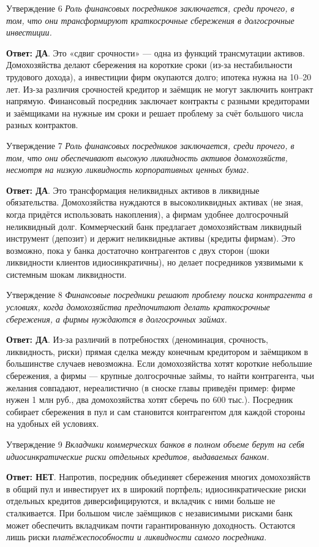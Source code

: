 \documentclass[10pt,a4paper]{article}
\newcommand{\qda}{\textbf{\color{yesgreen}Ответ: ДА}}
\newcommand{\qnet}{\textbf{\color{nored}Ответ: НЕТ}}
\newenvironment{answer}[2]{%
  \begin{qbox}{Утверждение #1}
  \textit{#2}\par\smallskip
}{%
  \end{qbox}\vspace{2pt}
}
\begin{document}
\begin{answer}{6}{Роль финансовых посредников заключается, среди прочего, в том, что они трансформируют краткосрочные сбережения в долгосрочные инвестиции.}
\qda. Это «сдвиг срочности» --- одна из функций трансмутации активов. Домохозяйства делают сбережения на короткие сроки (из-за нестабильности трудового дохода), а инвестиции фирм окупаются долго; ипотека нужна на 10--20 лет. Из-за различия срочностей кредитор и заёмщик не могут заключить контракт напрямую. Финансовый посредник заключает контракты с разными кредиторами и заёмщиками на нужные им сроки и решает проблему за счёт большого числа разных контрактов.
\end{answer}

\begin{answer}{7}{Роль финансовых посредников заключается, среди прочего, в том, что они обеспечивают высокую ликвидность активов домохозяйств, несмотря на низкую ликвидность корпоративных ценных бумаг.}
\qda. Это трансформация неликвидных активов в ликвидные обязательства. Домохозяйства нуждаются в высоколиквидных активах (не зная, когда придётся использовать накопления), а фирмам удобнее долгосрочный неликвидный долг. Коммерческий банк предлагает домохозяйствам ликвидный инструмент (депозит) и держит неликвидные активы (кредиты фирмам). Это возможно, пока у банка достаточно контрагентов с двух сторон (шоки ликвидности клиентов идиосинкратичны), но делает посредников уязвимыми к системным шокам ликвидности.
\end{answer}

\begin{answer}{8}{Финансовые посредники решают проблему поиска контрагента в условиях, когда домохозяйства предпочитают делать краткосрочные сбережения, а фирмы нуждаются в долгосрочных займах.}
\qda. Из-за различий в потребностях (деноминация, срочность, ликвидность, риски) прямая сделка между конечным кредитором и заёмщиком в большинстве случаев невозможна. Если домохозяйства хотят короткие небольшие сбережения, а фирмы --- крупные долгосрочные займы, то найти контрагента, чьи желания совпадают, нереалистично (в сноске главы приведён пример: фирме нужен 1 млн руб., два домохозяйства хотят сберечь по 600 тыс.). Посредник собирает сбережения в пул и сам становится контрагентом для каждой стороны на удобных ей условиях.
\end{answer}

\begin{answer}{9}{Вкладчики коммерческих банков в полном объеме берут на себя идиосинкратические риски отдельных кредитов, выдаваемых банком.}
\qnet. Напротив, посредник объединяет сбережения многих домохозяйств в общий пул и инвестирует их в широкий портфель; идиосинкратические риски отдельных кредитов диверсифицируются, и вкладчик с ними больше не сталкивается. При большом числе заёмщиков с независимыми рисками банк может обеспечить вкладчикам почти гарантированную доходность. Остаются лишь риски \emph{платёжеспособности и ликвидности самого посредника}.
\end{answer}
\end{document}
